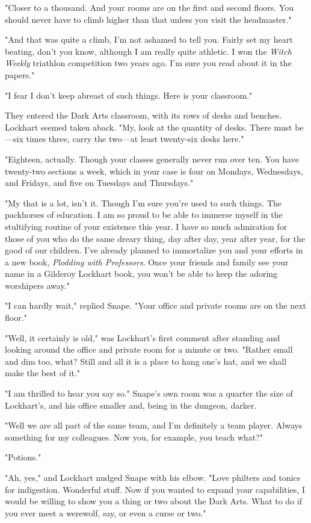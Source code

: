 "Closer to a thousand. And your rooms are on the first and second floors. You should never have to climb higher than that unless you visit the headmaster."

"And that was quite a climb, I'm not ashamed to tell you. Fairly set my heart beating, don't you know, although I am really quite athletic. I won the \emph{Witch Weekly} triathlon competition two years ago. I'm sure you read about it in the papers."

"I fear I don't keep abreast of such things. Here is your classroom."

They entered the Dark Arts classroom, with its rows of desks and benches. Lockhart seemed taken aback. "My, look at the quantity of desks. There must be—six times three, carry the two—at least twenty-six desks here."

"Eighteen, actually. Though your classes generally never run over ten. You have twenty-two sections a week, which in your case is four on Mondays, Wednesdays, and Fridays, and five on Tuesdays and Thursdays."

"My that is a lot, isn't it. Though I'm sure you're used to such things. The packhorses of education. I am so proud to be able to immerse myself in the stultifying routine of your existence this year. I have so much admiration for those of you who do the same dreary thing, day after day, year after year, for the good of our children. I've already planned to immortalize you and your efforts in a new book, \emph{Plodding with Professors}. Once your friends and family see your name in a Gilderoy Lockhart book, you won't be able to keep the adoring worshipers away."

"I can hardly wait," replied Snape. "Your office and private rooms are on the next floor."

"Well, it certainly is old," was Lockhart's first comment after standing and looking around the office and private room for a minute or two. "Rather small and dim too, what? Still and all it is a place to hang one's hat, and we shall make the best of it."

"I am thrilled to hear you say so." Snape's own room was a quarter the size of Lockhart's, and his office smaller and, being in the dungeon, darker.

"Well we are all part of the same team, and I'm definitely a team player. Always something for my colleagues. Now you, for example, you teach what?"

"Potions."

"Ah, yes," and Lockhart nudged Snape with his elbow. "Love philters and tonics for indigestion. Wonderful stuff. Now if you wanted to expand your capabilities, I would be willing to show you a thing or two about the Dark Arts. What to do if you ever meet a werewolf, say, or even a curse or two."


